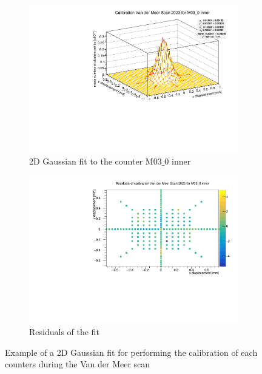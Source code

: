 \begin{figure}
    \centering
    \begin{subfigure}{0.48\textwidth}
    \includegraphics[width=\linewidth]{figures/M03_0.pdf}
    \caption{2D Gaussian fit to the counter M$03\_0$ inner}\label{fig:fit_M03}
    \end{subfigure}
    \begin{subfigure}{0.48\textwidth}
    \includegraphics[width=\linewidth]{figures/M03_0_res.pdf}
    \caption{Residuals of the fit}\label{fig:M03_res}
    \end{subfigure}
    \caption{Example of a 2D Gaussian fit for performing the calibration of each counters during the Van der Meer scan}
    \label{fig:fit_example}
\end{figure}

